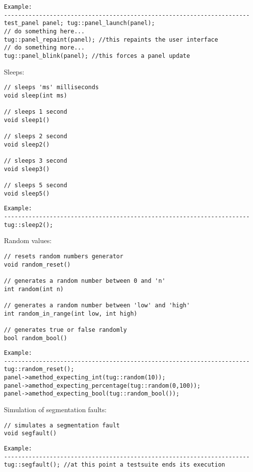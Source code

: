 \begin{lstlisting}
Example:
----------------------------------------------------------------------
test_panel panel; tug::panel_launch(panel);
// do something here...
tug::panel_repaint(panel); //this repaints the user interface
// do something more...
tug::panel_blink(panel); //this forces a panel update
\end{lstlisting}


Sleeps:
%
\begin{lstlisting}
// sleeps 'ms' milliseconds
void sleep(int ms)

// sleeps 1 second
void sleep1()

// sleeps 2 second
void sleep2()

// sleeps 3 second
void sleep3()

// sleeps 5 second
void sleep5()
\end{lstlisting}

\begin{lstlisting}
Example:
----------------------------------------------------------------------
tug::sleep2();
\end{lstlisting}


Random values:
%
\begin{lstlisting}
// resets random numbers generator
void random_reset()

// generates a random number between 0 and 'n'
int random(int n)

// generates a random number between 'low' and 'high'
int random_in_range(int low, int high)

// generates true or false randomly
bool random_bool()
\end{lstlisting}

\begin{lstlisting}
Example:
----------------------------------------------------------------------
tug::random_reset();
panel->amethod_expecting_int(tug::random(10));
panel->amethod_expecting_percentage(tug::random(0,100));
panel->amethod_expecting_bool(tug::random_bool());
\end{lstlisting}


Simulation of segmentation faults:
%
\begin{lstlisting}
// simulates a segmentation fault
void segfault()
\end{lstlisting}

\begin{lstlisting}
Example:
----------------------------------------------------------------------
tug::segfault(); //at this point a testsuite ends its execution
\end{lstlisting}



